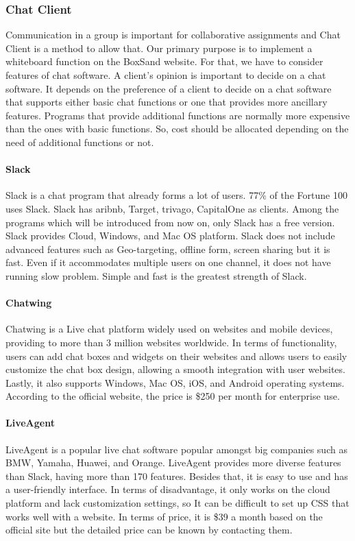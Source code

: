 \documentclass[10pt]{article}
\begin{document}
        \subsubsection{Chat Client}
            Communication in a group is important for collaborative assignments and Chat Client is a method to allow that. Our primary purpose is to implement a whiteboard function on the BoxSand website. For that, we have to consider features of chat software. A client’s opinion is important to decide on a chat software. It depends on the preference of a client to decide on a chat software that supports either basic chat functions or one that provides more ancillary features. Programs that provide additional functions are normally more expensive than the ones with basic functions. So, cost should be allocated depending on the need of additional functions or not.

            \paragraph{Slack}
                Slack is a chat program that already forms a lot of users. 77\% of the Fortune 100 uses Slack. Slack has aribnb, Target, trivago, CapitalOne as clients. Among the programs which will be introduced from now on, only Slack has a free version. Slack provides Cloud, Windows, and Mac OS platform. Slack does not include advanced features such as Geo-targeting, offline form, screen sharing but it is fast. Even if it accommodates multiple users on one channel, it does not have running slow problem. Simple and fast is the greatest strength of Slack.

            \paragraph{Chatwing}
                Chatwing is a Live chat platform widely used on websites and mobile devices, providing to more than 3 million websites worldwide. In terms of functionality, users can add chat boxes and widgets on their websites and allows users to easily customize the chat box design, allowing a smooth integration with user websites. Lastly, it also supports Windows, Mac OS, iOS, and Android operating systems. According to the official website, the price is \$250 per month for enterprise use. \cite{Chatwing Price}

             \paragraph{LiveAgent}
                LiveAgent is a popular live chat software popular amongst big companies such as BMW, Yamaha, Huawei, and Orange. LiveAgent provides more diverse features than Slack, having more than 170 features. Besides that, it is easy to use and has a user-friendly interface. In terms of disadvantage, it only works on the cloud platform and lack customization settings, so It can be difficult to set up CSS that works well with a website. In terms of price, it is \$39 a month based on the official site but the detailed price can be known by contacting them. \cite{LiveAgent Price}
\end{document}
